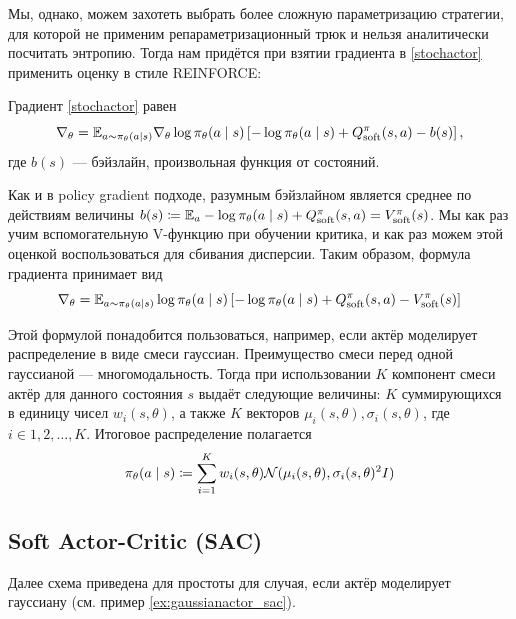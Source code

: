 Мы, однако, можем захотеть выбрать более сложную параметризацию стратегии, для которой не применим репараметризационный трюк и нельзя аналитически посчитать энтропию. Тогда нам придётся при взятии градиента в \eqref{stochactor} применить оценку в стиле REINFORCE:

\begin{proposition}
Градиент \eqref{stochactor} равен
$$\nabla_\theta = \mathbb{E}_{a \sim \pi_\theta(a \mid s)} \nabla_{\theta} \log \pi_\theta(a \mid s) \left[ -\log \pi_\theta(a \mid s) + Q^\pi_{\mathrm{soft}}(s, a) - b(s) \right],$$
где $b(s)$ --- бэйзлайн, произвольная функция от состояний.
\end{proposition}

Как и в policy gradient подходе, разумным бэйзлайном является среднее по действиям величины $b(s) \coloneqq \mathbb{E}_a -\log \pi_\theta(a \mid s) + Q^\pi_{\mathrm{soft}}(s, a) = V^\pi_{\mathrm{soft}}(s)$. Мы как раз учим вспомогательную V-функцию при обучении критика, и как раз можем этой оценкой воспользоваться для сбивания дисперсии. Таким образом, формула градиента принимает вид
$$\nabla_\theta = \mathbb{E}_{a \sim \pi_\theta(a \mid s)} \log \pi_\theta(a \mid s) \left[ -\log \pi_\theta(a \mid s) + Q^\pi_{\mathrm{soft}}(s, a) - V^\pi_{\mathrm{soft}}(s) \right]$$

\begin{example}
Этой формулой понадобится пользоваться, например, если актёр моделирует распределение в виде смеси гауссиан. Преимущество смеси перед одной гауссианой --- многомодальность. Тогда при использовании $K$ компонент смеси актёр для данного состояния $s$ выдаёт следующие величины: $K$ суммирующихся в единицу чисел $w_i(s, \theta)$, а также $K$ векторов $\mu_i(s, \theta), \sigma_i(s, \theta)$, где $i \in {1, 2, \dots, K}$. Итоговое распределение полагается
$$\pi_\theta(a \mid s) \coloneqq \sum_{i = 1}^K w_i(s, \theta) \mathcal{N}(\mu_i(s, \theta), \sigma_i(s, \theta)^2I)$$
\end{example}

\subsection{Soft Actor-Critic (SAC)}

Далее схема приведена для простоты для случая, если актёр моделирует гауссиану (см. пример \ref{ex:gaussianactor_sac}). 

